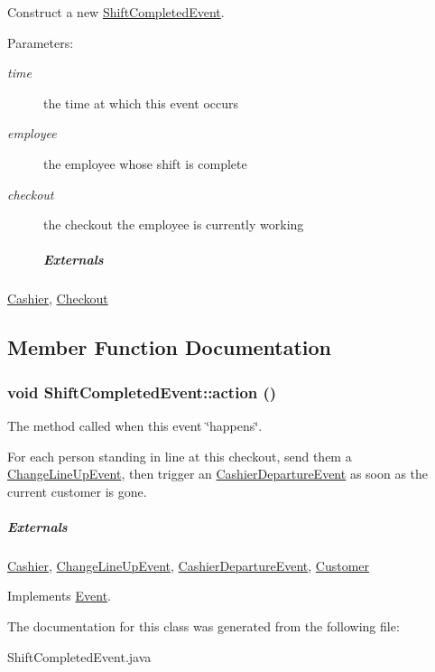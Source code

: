 Construct a new \hyperlink{class_shift_completed_event}{ShiftCompletedEvent}. 

\begin{Desc}
\item[Parameters:]
\begin{description}
\item[{\em time}]the time at which this event occurs \item[{\em employee}]the employee whose shift is complete \item[{\em checkout}]the checkout the employee is currently working \subparagraph*{Externals}\end{description}
\end{Desc}
\hyperlink{class_cashier}{Cashier}, \hyperlink{class_checkout}{Checkout} 

\subsection{Member Function Documentation}
\hypertarget{class_shift_completed_event_4b09c21b802da89066245fbfc0111049}{
\subsubsection[{action}]{\setlength{\rightskip}{0pt plus 5cm}void ShiftCompletedEvent::action ()}}
\label{class_shift_completed_event_4b09c21b802da89066245fbfc0111049}


The method called when this event \char`\"{}happens\char`\"{}. 

For each person standing in line at this checkout, send them a \hyperlink{class_change_line_up_event}{ChangeLineUpEvent}, then trigger an \hyperlink{class_cashier_departure_event}{CashierDepartureEvent} as soon as the current customer is gone. \subparagraph*{Externals}

\hyperlink{class_cashier}{Cashier}, \hyperlink{class_change_line_up_event}{ChangeLineUpEvent}, \hyperlink{class_cashier_departure_event}{CashierDepartureEvent}, \hyperlink{class_customer}{Customer} 

Implements \hyperlink{class_event_fea360b9a95713e43cf3f9fa44150074}{Event}.

The documentation for this class was generated from the following file:\begin{CompactItemize}
\item 
ShiftCompletedEvent.java\end{CompactItemize}
